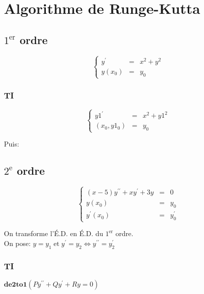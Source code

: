 \section{Algorithme de Runge-Kutta}
\raggedright
\subsection{$1^{\mathrm{er}}$ ordre}

\begin{equation*}
    \left\{ \begin{array}{rcl}
        y^{\prime} & = & x^2+y^2 \\
        y(x_0) & = & y_0
    \end{array}\right.
\end{equation*}

\subsubsection{TI}
\begin{equation*}
    \left\{ \begin{array}{rcl}
        y1^{\prime} & = & x^2+y1^2 \\
        (x_0,y1_0) & = & y_0
    \end{array}\right.
\end{equation*}

Puis: 

\subsection{$2^{\mathrm{e}}$ ordre}

\begin{equation*}
    \left\{ \begin{array}{rcl}
        (x-5)y^{\prime\prime} +xy^{\prime}+3y & = & 0 \\
        y(x_0) & = & y_0\\
        y^{\prime}(x_0) & = & y^{\prime}_0
    \end{array}\right.
\end{equation*}


On transforme l'É.D. en É.D. du $1^{\mathrm{er}}$ ordre.\\
On pose: \( y=y_1 \;\mathrm{ et }\; y^{\prime}=y_2 \Longleftrightarrow y^{\prime\prime}=y^{\prime}_2 \)\\
\subsubsection{TI}
\centering
\(\mathbf{de2to1}(Py^{\prime\prime} +Qy^{\prime}+Ry = 0)\)\\\raggedright

